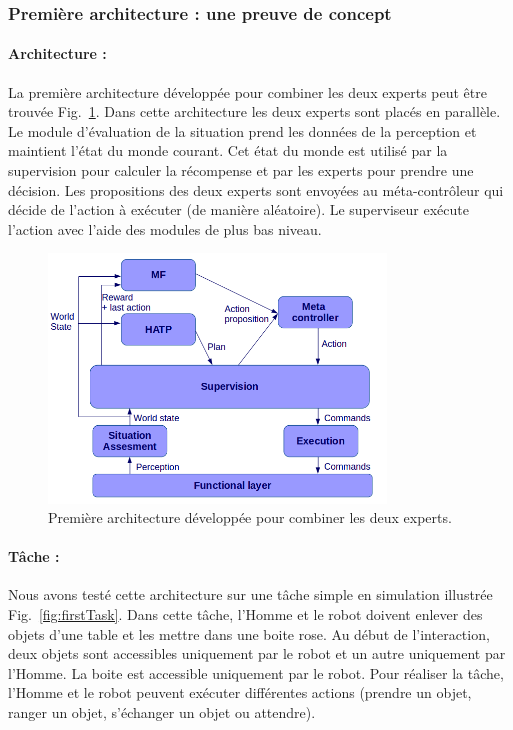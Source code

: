 \documentclass[english,a4paper,11pt,twoside]{StyleThese}
\begin{document}
\subsubsection{Première architecture : une preuve de concept}


\paragraph{Architecture :}

La première architecture développée pour combiner les deux experts peut être trouvée Fig.~\ref{fig:FirstArchi}. Dans cette architecture les deux experts sont placés en parallèle. Le module d'évaluation de la situation prend les données de la perception et maintient l'état du monde courant. Cet état du monde est utilisé par la supervision pour calculer la récompense et par les experts pour prendre une décision. Les propositions des deux experts sont envoyées au méta-contrôleur qui décide de l'action à exécuter (de manière aléatoire). Le superviseur exécute l'action avec l'aide des modules de plus bas niveau.

\begin{figure}[!h]
	\centering
    \includegraphics[width=0.8\textwidth]{figs/Chapter7/FirstArchi.png}
    \caption{Première architecture développée pour combiner les deux experts.}
    \label{fig:FirstArchi}
\end{figure}


\paragraph{Tâche :}

Nous avons testé cette architecture sur une tâche simple en simulation illustrée Fig.~\ref{fig:firstTask}. Dans cette tâche, l'Homme et le robot doivent enlever des objets d'une table et les mettre dans une boite rose. Au début de l’interaction, deux objets sont accessibles uniquement par le robot et un autre uniquement par l'Homme. La boite est accessible uniquement par le robot. Pour réaliser la tâche, l'Homme et le robot peuvent exécuter différentes actions (prendre un objet, ranger un objet, s'échanger un objet ou attendre).
\end{document}
